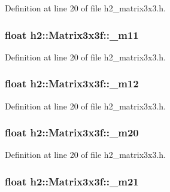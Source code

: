 Definition at line 20 of file h2\-\_\-matrix3x3.\-h.

\hypertarget{classh2_1_1_matrix3x3f_af0e704fa5344bb4455bc5a1c66bb3a36}{
\subsubsection[{\-\_\-m11}]{\setlength{\rightskip}{0pt plus 5cm}float h2\-::\-Matrix3x3f\-::\-\_\-m11}}\label{classh2_1_1_matrix3x3f_af0e704fa5344bb4455bc5a1c66bb3a36}


Definition at line 20 of file h2\-\_\-matrix3x3.\-h.

\hypertarget{classh2_1_1_matrix3x3f_a756c178c190b53c5a4f009b8270c7336}{
\subsubsection[{\-\_\-m12}]{\setlength{\rightskip}{0pt plus 5cm}float h2\-::\-Matrix3x3f\-::\-\_\-m12}}\label{classh2_1_1_matrix3x3f_a756c178c190b53c5a4f009b8270c7336}


Definition at line 20 of file h2\-\_\-matrix3x3.\-h.

\hypertarget{classh2_1_1_matrix3x3f_aabd955bbe77898ec6d280ee7d549b8fa}{
\subsubsection[{\-\_\-m20}]{\setlength{\rightskip}{0pt plus 5cm}float h2\-::\-Matrix3x3f\-::\-\_\-m20}}\label{classh2_1_1_matrix3x3f_aabd955bbe77898ec6d280ee7d549b8fa}


Definition at line 20 of file h2\-\_\-matrix3x3.\-h.

\hypertarget{classh2_1_1_matrix3x3f_a8d253a1eac9bfb0c2ad5a9988b5e1866}{
\subsubsection[{\-\_\-m21}]{\setlength{\rightskip}{0pt plus 5cm}float h2\-::\-Matrix3x3f\-::\-\_\-m21}}\label{classh2_1_1_matrix3x3f_a8d253a1eac9bfb0c2ad5a9988b5e1866}


